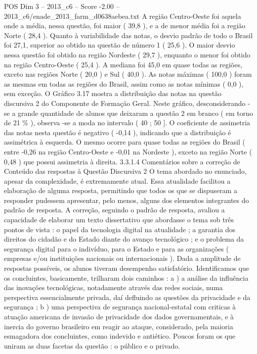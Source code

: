 \begin{textsample}{POS Dim 3 – 2013\_c6 – Score -2.00 – 2013\_c6/enade\_2013\_farm\_d0638aebea.txt}
A região Centro-Oeste foi aquela onde a média, nessa questão, foi maior ( 39,8 ), e a de menor média foi a região Norte ( 28,4 ).
Quanto à variabilidade das notas, o desvio padrão de todo o Brasil foi 27,1, superior ao obtido na questão de número 1 ( 25,6 ).
O maior desvio nessa questão foi obtido na região Nordeste ( 29,7 ), enquanto o menor foi obtido na região Centro-Oeste ( 25,4 ).
A mediana foi 45,0 em quase todas as regiões, exceto nas regiões Norte ( 20,0 ) e Sul ( 40,0 ).
As notas máximas ( 100,0 ) foram as mesmas em todas as regiões do Brasil, assim como as notas mínimas ( 0,0 ), sem exceção.
O Gráfico 3.17 mostra a distribuição das notas na questão discursiva 2 do Componente de Formação Geral.
Neste gráfico, desconsiderando -se a grande quantidade de alunos que deixaram a questão 2 em branco ( em torno de 21 \% ), observa -se a moda no intervalo ( 40 ; 50 ].
O coeficiente de assimetria das notas nesta questão é negativo ( -0,14 ), indicando que a distribuição é assimétrica à esquerda.
O mesmo ocorre para quase todas as regiões do Brasil ( entre -0,26 na região Centro-Oeste e -0,01 na Nordeste ), exceto na região Norte ( 0,48 ) que possui assimetria à direita. 3.3.1.4 Comentários sobre a correção de Conteúdo das respostas à Questão Discursiva 2 O tema abordado no enunciado, apesar da complexidade, é extremamente atual.
Essa atualidade facilitou a elaboração de alguma resposta, permitindo que todos os que se dispuseram a responder pudessem apresentar, pelo menos, alguns dos elementos integrantes do padrão de resposta.
A correção, seguindo o padrão de resposta, avaliou a capacidade de elaborar um texto dissertativo que abordasse o tema sob três pontos de vista : o papel da tecnologia digital na atualidade ; a garantia dos direitos do cidadão e do Estado diante do avanço tecnológico ; e o problema da segurança digital para o indivíduo, para o Estado e para as organizações ( empresas e/ou instituições nacionais ou internacionais ).
Dada a amplitude de respostas possíveis, os alunos tiveram desempenho satisfatório.
Identificamos que os concluintes, basicamente, trilharam dois caminhos : a ) a análise da influência das inovações tecnológicas, notadamente através das redes sociais, numa perspectiva essencialmente privada, daí defluindo as questões da privacidade e da segurança ; b ) uma perspectiva de segurança nacional-estatal com criticas à atuação americana de invasão de privacidade dos dados governamentais, e à inercia do governo brasileiro em reagir ao ataque, considerado, pela maioria esmagadora dos concluintes, como indevido e antiético.
Poucos foram os que uniram as duas facetas da questão : o público e o privado.

\end{textsample}
